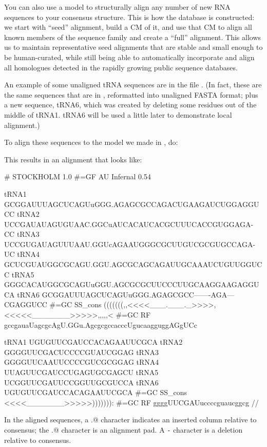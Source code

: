 You can also use a model to structurally align any number of new RNA
sequences to your consensus structure. This is how the 
database is constructed: we start with ``seed'' alignment, build a CM
of it, and use that CM to align all known members of the sequence
family and create a ``full'' alignment. This allows us to maintain
representative seed alignments that are stable and small enough to be
human-curated, while still being able to automatically incorporate and
align all homologues detected in the rapidly growing public sequence
databases.

An example of some unaligned tRNA sequences are in the file
. (In fact, these are the same sequences that are in
, reformatted into unaligned FASTA format; plus a
new sequence, tRNA6, which was created by deleting some residues out
of the middle of tRNA1. tRNA6 will be used a little later to
demonstrate local alignment.)

To align these sequences to the model we made in , do:


This results in an alignment that looks like:

\begin{sreoutput}
# STOCKHOLM 1.0
#=GF AU    Infernal 0.54

tRNA1             GCGGAUUUAGCUCAGUuGGG.AGAGCGCCAGACUGAAGAUCUGGAGGUCC
tRNA2             UCCGAUAUAGUGUAAC.GGCuAUCACAUCACGCUUUCACCGUGGAGA-CC
tRNA3             UCCGUGAUAGUUUAAU.GGUcAGAAUGGGCGCUUGUCGCGUGCCAGA-UC
tRNA4             GCUCGUAUGGCGCAGU.GGU.AGCGCAGCAGAUUGCAAAUCUGUUGGUCC
tRNA5             GGGCACAUGGCGCAGUuGGU.AGCGCGCUUCCCUUGCAAGGAAGAGGUCA
tRNA6             GCGGAUUUAGCUCAGUuGGG.AGAGCGCC-------AGA---CGAGGUCC
#=GC SS_cons      (((((((,,<<<<___.___._>>>>,<<<<<_______>>>>>,,,,,<
#=GC RF           gccgauaUagcgcAgU.GGu.AgcgcgccacccUgucaagguggAGgUCc

tRNA1             UGUGUUCGAUCCACAGAAUUCGCA
tRNA2             GGGGUUCGACUCCCCGUAUCGGAG
tRNA3             GGGGUUCAAUUCCCCGUCGCGGAG
tRNA4             UUAGUUCGAUCCUGAGUGCGAGCU
tRNA5             UCGGUUCGAUUCCGGUUGCGUCCA
tRNA6             UGUGUUCGAUCCACAGAAUUCGCA
#=GC SS_cons      <<<<_______>>>>>))))))):
#=GC RF           ggggUUCGAUuccccguaucggcg
//
\end{sreoutput}

In the aligned sequences, a \verb@.@ character indicates an inserted
column relative to consensus; the \verb@.@ character is an alignment
pad. A \verb+-+ character is a deletion relative to consensus.

